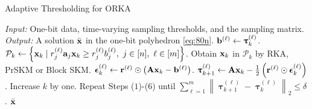 \documentclass[12pt,draftcls,onecolumn]{IEEEtran}
\begin{document}
    
\begin{algorithm}[t]
\caption{Adaptive Thresholding for ORKA}
\label{algorithm_20}
\begin{algorithmic}[1]
\Statex \emph{Input:} One-bit data,
time-varying sampling thresholds,
and the sampling matrix. %
\Statex \emph{Output:} A solution $\bar{\mathbf{x}}$ in the one-bit polyhedron \eqref{eq:80n}.
\State $\mathbf{b}^{(\ell)}\gets\boldsymbol{\uptau}_{k}^{(\ell)}$.
\State $\mathcal{P}_{k}\gets\left\{\mathbf{x}_{k}\mid r_j^{(\ell)}\mathbf{a}_j\mathbf{x}_k\geq r_j^{(\ell)}b_j^{(\ell)},~j\in[n],~\ell\in[m]\right\}$.
\State Obtain $\mathbf{x}_k$ in $\mathcal{P}_{k}$ by RKA, PrSKM or Block SKM.
\State $\boldsymbol{\epsilon}^{(\ell)}_{k}\gets\mathbf{r}^{(\ell)}\odot\left(\mathbf{A}\mathbf{x}_k-\mathbf{b}^{(\ell)}\right)$.
\State $\boldsymbol{\uptau}^{(\ell)}_{k+1}\gets\mathbf{A}\mathbf{x}_{k}-\frac{1}{2}\left(\mathbf{r}^{(\ell)}\odot\boldsymbol{\epsilon}^{(\ell)}_{k}\right)$.
\State Increase $k$ by one.
\State Repeat Steps ($1$)-($6$) until
$\sum_{\ell=1}^{m}\left\|\boldsymbol{\uptau}^{(\ell)}_{k+1}-\boldsymbol{\uptau}^{(\ell)}_{k}\right\|_{2}\leq\delta$.
\State \Return $\bar{\mathbf{x}}$
\end{algorithmic}
\end{algorithm}
\end{document}
